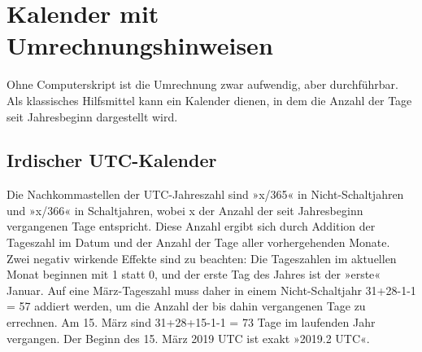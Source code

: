 \section{Kalender mit Umrechnungshinweisen}

Ohne Computerskript ist die Umrechnung zwar aufwendig, aber durchführbar. Als klassisches Hilfsmittel kann ein Kalender dienen, in dem die Anzahl der Tage seit Jahresbeginn dargestellt wird.

\subsection{Irdischer UTC-Kalender}

Die Nachkommastellen der UTC-Jahreszahl sind »x/365« in Nicht-Schaltjahren und »x/366« in Schaltjahren, wobei x der Anzahl der seit Jahresbeginn vergangenen Tage entspricht. Diese Anzahl ergibt sich durch Addition der Tageszahl im Datum und der Anzahl der Tage aller vorhergehenden Monate. Zwei negativ wirkende Effekte sind zu beachten: Die Tageszahlen im aktuellen Monat beginnen mit 1 statt 0, und der erste Tag des Jahres ist der »erste« Januar. Auf eine März-Tageszahl muss daher in einem Nicht-Schaltjahr 31+28-1-1 = 57 addiert werden, um die Anzahl der bis dahin vergangenen Tage zu errechnen. Am 15. März sind 31+28+15-1-1 = 73 Tage im laufenden Jahr vergangen. Der Beginn des 15. März 2019 UTC ist exakt »2019.2 UTC«.

